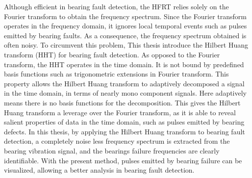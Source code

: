 \documentclass[../Main/thesis.tex]{subfiles}
\begin{document}
 \justify
 Although efficient in bearing fault detection, the HFRT relies solely on the Fourier transform to obtain the frequency spectrum. Since the Fourier transform operates in the frequency domain, it ignores local temporal events such as pulses emitted by bearing faults. As a consequence, the frequency spectrum obtained is often noisy. To circumvent this problem, This thesis introduce the Hilbert Huang transform (HHT) for bearing fault detection. As opposed to the Fourier transform, the HHT operates in the time domain. It is not bound by predefined basis functions such as trigonometric extensions in Fourier transform. This property allows the Hilbert Huang transform to adaptively decomposed a signal in the time domain, in terms of nearly mono component signals. Here adaptively means there is no basis functions for the decomposition. This gives the Hilbert Huang transform a leverage over the Fourier transform, as it is able to reveal salient properties of data in the time domain, such as pulses emitted by bearing defects.
 \justify
 In this thesis, by applying the Hilbert Huang transform to bearing fault detection, a completely noise less frequency spectrum is extracted from the bearing vibration signal, and the bearings failure frequencies are clearly identifiable. With the present method, pulses emitted by bearing failure can be visualized, allowing a better analysis in bearing fault detection.

\vfill\vfill
\clearpage
\blankpage
\end{document}
